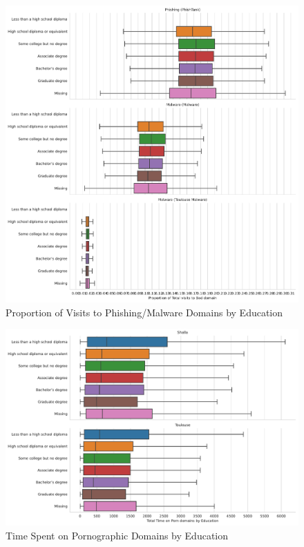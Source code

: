 \documentclass[12pt, letterpaper]{article}
\begin{document}
\begin{figure}[!htb]
  \centering
  \caption{Proportion of Visits to Phishing/Malware Domains by Education}
	\label{fig:prop_total_visits_phishing_malware_educ}
	\includegraphics[width=\textwidth]{figs/prop_total_visits_phishing_malware_tl_educ.pdf}
\end{figure}

\begin{figure}[!htb]
  \centering
  \caption{Time Spent on Pornographic Domains by Education}
  \label{fig:total_time_porn_educ}
  \includegraphics[width=\textwidth]{figs/total_time_porn_educ.pdf}
\end{figure}
\end{document}
